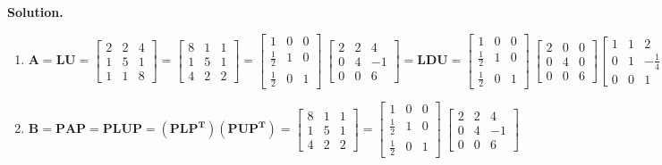 \documentclass[english,onecolumn]{IEEEtran}
\begin{document}
\noindent\textbf{Solution.}
\begin{enumerate}
    \item 
    
    	$
    \mathbf{A} = \mathbf{LU}=
    \begin{bmatrix}
    	2& 2&4 \\
    	1&5&1\\
    	1&1&8
    \end{bmatrix}=
    \begin{bmatrix}
	8& 1&1 \\
	1&5&1\\
	4&2&2
\end{bmatrix}=
\begin{bmatrix}
	1& 0&0 \\
	\frac{1}{2}&1&0\\
	\frac{1}{2}& 0 &1
\end{bmatrix}\
\begin{bmatrix}
	2& 2&4 \\
	0&4&-1\\
	0&0&6
\end{bmatrix}
=\mathbf{LDU}=
    \begin{bmatrix}
	1& 0&0 \\
	\frac{1}{2}&1&0\\
	\frac{1}{2}& 0 &1
	\end{bmatrix}\
	\begin{bmatrix}
		2& 0&0 \\
		0&4&0\\
		0&0&6
	\end{bmatrix}
	\begin{bmatrix}
	1& 1&2 \\
	0&1&-\frac{1}{4}\\
	0&0&1
	\end{bmatrix}
   $
    
    \item 
    
    $
    \mathbf{B} =\mathbf{PAP} 
    =\mathbf{PLUP}= \mathbf{(PLP^T)(PUP^T)}=
    \begin{bmatrix}
    	8& 1&1 \\
    	1&5&1\\
    	4&2&2
    \end{bmatrix}=
    \begin{bmatrix}
	1& 0&0 \\
	\frac{1}{2}&1&0\\
	\frac{1}{2}& 0 &1
    \end{bmatrix}\
    \begin{bmatrix}
	2& 2&4 \\
	0&4&-1\\
	0&0&6
    \end{bmatrix}
    $
    

\end{enumerate}
\end{document}
